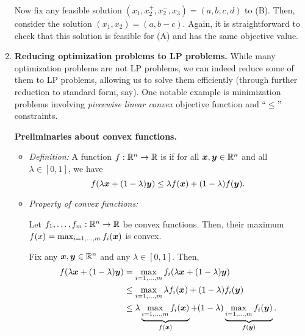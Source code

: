 \begin{enumerate}
\begin{pf}
Now fix any feasible solution \((x_1,x_2^{+},x_2^{-},x_3)=(a,b,c,d)\) to (B).
Then, consider the solution \((x_1,x_2)=(a,b-c)\).  Again, it is
straightforward to check that this solution is feasible for (A) and has the
same objective value.
\end{pf}
\item\label{it:piecewise-linear-cvx-to-lp} \textbf{Reducing optimization problems to LP problems.}
While many optimization problems are not LP problems, we can indeed reduce some
of them to LP problems, allowing us to solve them efficiently (through further
reduction to standard form, say). One notable example is minimization problems
involving \emph{piecewise linear convex} objective function and ``\(\leq\)''
constraints.

\textbf{Preliminaries about convex functions.}
\begin{itemize}
\item \emph{Definition:} A function \(f:\mathbb{R}^n\to \mathbb{R}\) is  if for
all \(\bm{x},\bm{y}\in\mathbb{R}^n\) and all \(\lambda\in[0,1]\), we have
\[
f(\lambda\bm{x}+(1-\lambda)\bm{y})\le\lambda
f(\bm{x})+(1-\lambda)f(\bm{y}).
\]
\begin{center}
\end{center}
\item \emph{Property of convex functions:}
\begin{proposition}
\label{prp:max-cvx-cvx}
Let \(f_1,\dotsc,f_m:\mathbb{R}^n\to\mathbb{R}\) be convex functions. Then, their
maximum \(f(x)=\max_{i=1,\dotsc,m}f_i(\bm{x})\) is convex.
\end{proposition}
\begin{pf}
Fix any \(\bm{x},\bm{y}\in\mathbb{R}^n\) and any \(\lambda\in[0,1]\). Then,
\begin{align*}
f(\lambda\bm{x}+(1-\lambda)\bm{y})
&=\max_{i=1,\dotsc,m}f_i(\lambda\bm{x}+(1-\lambda)\bm{y}) \\
&\le\max_{i=1,\dotsc,m}\lambda f_i(\bm{x})+(1-\lambda)f_i(\bm{y}) \\
&\le \lambda \underbrace{\max_{i=1,\dotsc,m}f_i(\bm{x})}_{f(\bm{x})}
+(1-\lambda)\underbrace{\max_{i=1,\dotsc,m}f_i(\bm{y})}_{f(\bm{y})}.
\end{align*}
\end{pf}
\end{itemize}


\end{enumerate}
